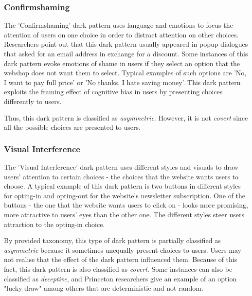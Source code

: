            \subsubsection{Confirmshaming}
            The 'Confirmshaming' dark pattern uses language and emotions to focus the attention of users on one choice in order to distract attention on other choices. Researchers point out that this dark pattern usually appeared in popup dialogues that asked for an email address in exchange for a discount. Some instances of this dark pattern evoke emotions of shame in users if they select an option that the webshop does not want them to select. Typical examples of such options are 'No, I want to pay full price' or 'No thanks, I hate saving money'. This dark pattern exploits the framing effect of cognitive bias in users by presenting choices differently to users.
            
            Thus, this dark pattern is classified as \emph{asymmetric}. However, it is not \emph{covert} since all the possible choices are presented to users.
    
            \subsubsection{Visual Interference}
            The 'Visual Interference' dark pattern uses different styles and visuals to draw users' attention to certain choices - the choices that the website wants users to choose. A typical example of this dark pattern is two buttons in different styles for opting-in and opting-out for the website's newsletter subscription. One of the buttons - the one that the website wants users to click on - looks more promising, more attractive to users' eyes than the other one. The different styles steer users attraction to the opting-in choice. 
            
            By provided taxonomy, this type of dark pattern is partially classified as \emph{asymmetric} because it sometimes unequally present choices to users. Users may not realise that the effect of the dark pattern influenced them. Because of this fact, this dark pattern is also classified as \emph{covert}. Some instances can also be classified as \emph{deceptive}, and Princeton researchers give an example of an option "lucky draw" among others that are deterministic and not random.
            
